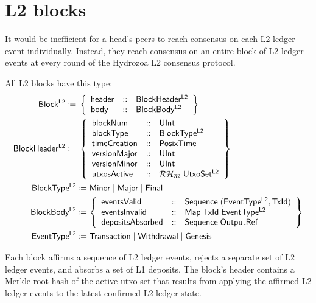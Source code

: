 \documentclass[../hydrozoa.tex]{subfiles}
\begin{document}
\chapter{L2 blocks}%
\label{h:l2-blocks}%

It would be inefficient for a head's peers to reach consensus on each L2 ledger event individually.
Instead, they reach consensus on an entire block of L2 ledger events at every round of the Hydrozoa L2 consensus protocol.

All L2 blocks have this type:
\begin{equation*}
\begin{split}
  \T{Block^{L2}} \coloneq&\; \left\{
    \begin{array}{lll}
      \T{header} &::& \T{BlockHeader^{L2}} \\
      \T{body} &::& \T{BlockBody^{L2}}
    \end{array}\right\} \\
  \blockHeaderTypeName{} \coloneq&\; \blockHeaderTypeBody{} \\
  \T{BlockType^{L2}} &\coloneq
    \T{Minor} \mid
    \T{Major} \mid
    \T{Final} \\
  \T{BlockBody^{L2}} &\coloneq \left\{
  \begin{array}{lll}
    \T{eventsValid} &::&
      \T{Sequence} \; (\T{EventType^{L2}}, \T{TxId}) \\
    \T{eventsInvalid} &::&
      \T{Map} \; \T{TxId} \; \T{EventType^{L2}} \\
    \T{depositsAbsorbed} &::& \T{Sequence} \; \T{OutputRef}
  \end{array}\right\} \\
  \T{EventType^{L2}} &\coloneq \T{Transaction} \mid \T{Withdrawal} \mid \T{Genesis}
\end{split}
\end{equation*}

Each block affirms a sequence of L2 ledger events, rejects a separate set of L2 ledger events, and absorbs a set of L1 deposits.
The block's header contains a Merkle root hash of the active utxo set that results from applying the affirmed L2 ledger events to the latest confirmed L2 ledger state.
\end{document}
